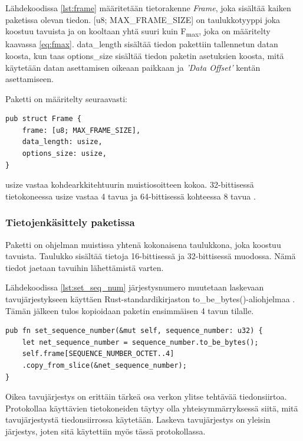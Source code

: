 \documentclass[a4paper,12pt]{article}
\begin{document}
    Lähdekoodissa \ref{lst:frame} määritetään tietorakenne \textit{Frame}, joka sisältää kaiken paketissa olevan tiedon.
    [u8; MAX\_FRAME\_SIZE]  on taulukkotyyppi joka koostuu tavuista ja on kooltaan yhtä suuri kuin F\textsubscript{max}, joka on määritelty kaavassa \ref{eq:fmax}.
    data\_length sisältää tiedon pakettiin tallennetun datan koosta, kun taas options\_size sisältää tiedon paketin asetuksien koosta, mitä käytetään datan asettamisen oikeaan paikkaan ja \textit{'Data Offset'} kentän asettamiseen.
    
    Paketti on määritelty seuraavasti:
    \begin{lstlisting}[caption={Paketin rakenne}, label={lst:frame}]
pub struct Frame {
    frame: [u8; MAX_FRAME_SIZE],
    data_length: usize,
    options_size: usize,
}\end{lstlisting}
    
    usize vastaa kohdearkkitehtuurin muistiosoitteen kokoa. 32-bittisessä tietokoneessa usize vastaa 4 tavua ja 64-bittisessä kohteessa 8 tavua \cite[\textit{usize}]{rust-std}.
   
    \subsubsection*{Tietojenkäsittely paketissa}
    Paketti on ohjelman muistissa yhtenä kokonaisena taulukkona, joka koostuu tavuista.
    Taulukko sisältää tietoja 16-bittisessä ja 32-bittisessä muodossa. Nämä tiedot jaetaan tavuihin lähettämistä varten.

    Lähdekoodissa \ref{lst:set_seq_num} järjestysnumero muutetaan laskevaan tavujärjestykseen käyttäen Rust-standardikirjaston to\_be\_bytes()-aliohjelmaa \cite[\textit{u32}]{rust-std}. Tämän jälkeen tulos kopioidaan paketin ensimmäisen 4 tavun tilalle. \par
    
        \begin{lstlisting}[caption={Järjestysnumeron asettaminen pakettiin}, label={lst:set_seq_num}]
pub fn set_sequence_number(&mut self, sequence_number: u32) {
    let net_sequence_number = sequence_number.to_be_bytes();
    self.frame[SEQUENCE_NUMBER_OCTET..4]
    .copy_from_slice(&net_sequence_number);
}\end{lstlisting}


    Oikea tavujärjestys on erittäin tärkeä osa verkon ylitse tehtävää tiedonsiirtoa. Protokollaa käyttävien tietokoneiden täytyy olla yhteisymmärryksessä siitä, mitä tavujärjestystä tiedonsiirrossa käytetään. Laskeva tavujärjestys on yleisin järjestys, joten sitä käytettiin myös tässä protokollassa. \par
    
\end{document}
